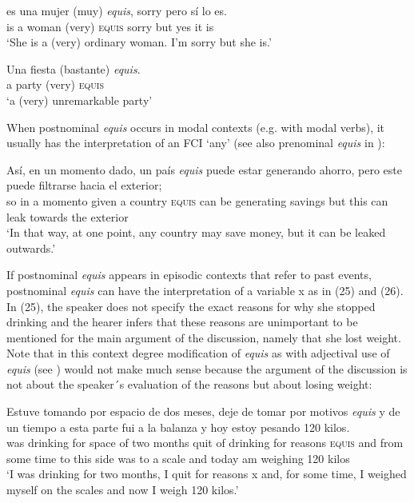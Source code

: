\documentclass[output=paper
,modfonts
,nonflat]{langsci/langscibook}
\begin{document}
\ea
\gll  es una mujer (muy) \textit{equis}, sorry pero sí lo es.\\
is a woman (very) \textsc{equis} sorry but yes it is\\
\glt ‘She is a (very) ordinary woman. I’m sorry but she is.’
\z

\ea
\gll  Una fiesta (bastante) \textit{equis}.\\
a party (very) \textsc{equis}\\
\glt ‘a (very) unremarkable party’
\z

When postnominal \textit{equis} occurs in modal contexts (e.g. with modal verbs), it usually has the interpretation of an FCI ‘any’ (see also prenominal \textit{equis} in ):

\ea
\gll  Así, en un momento dado, un país \textit{equis} puede estar generando ahorro, pero este puede filtrarse hacia el exterior;\\
so in a momento given a country \textsc{equis} can be generating savings but this can leak towards the exterior\\
\glt ‘In that way, at one point, any country may save money, but it can be leaked outwards.’
\z

If postnominal \textit{equis} appears in episodic contexts that refer to past events, postnominal \textit{equis} can have the interpretation of a variable x as in (25) and (26). In (25), the speaker does not specify the exact reasons for why she stopped drinking and the hearer infers that these reasons are unimportant to be mentioned for the main argument of the discussion, namely that she lost weight. Note that in this context degree modification of \textit{equis} as with adjectival use of \textit{equis} (see ) would not make much sense because the argument of the discussion is not about the speaker´s evaluation of the reasons but about losing weight:

\ea
\gll  Estuve tomando por espacio de dos meses, deje de tomar por motivos \textit{equis} y de un tiempo a esta parte fui a la balanza y hoy estoy pesando 120 kilos.\\
was drinking for space of two months quit of drinking for reasons \textsc{equis} and from some time to this side was to a scale and today am weighing 120 kilos\\
\glt ‘I was drinking for two months, I quit for reasons x and, for some time, I weighed myself on the scales and now I weigh 120 kilos.’
\z
\end{document}
